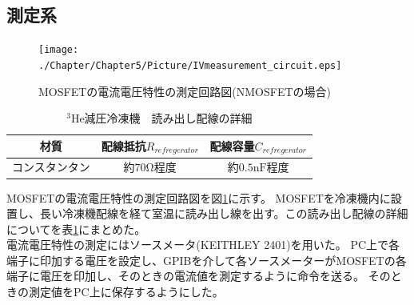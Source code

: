 		\subsection{測定系}
			\begin{figure}[htbp]
				\begin{center}
					\texttt{[image: ./Chapter/Chapter5/Picture/IVmeasurement\_circuit.eps]}
					\caption{MOSFETの電流電圧特性の測定回路図(NMOSFETの場合)}
					\label{fig:IVmeasurement_circuit}
				\end{center}
			\end{figure}
			\begin{table}[htb]
				\begin{center}
					\begin{tabular}{| c | c | c |} \hline
						材質 & 配線抵抗$R_{refregerator}$ & 配線容量$C_{refregerator}$ \\ \hline \hline
						コンスタンタン & 約$70 \mathrm{\Omega}$程度 & 約$0.5 \mathrm{nF}$程度 \\ \hline
					\end{tabular}
					\caption{$\mathrm{^{3}He}$減圧冷凍機　読み出し配線の詳細}
					\label{tab:refregerator_wire}
				\end{center}
			\end{table}
			MOSFETの電流電圧特性の測定回路図を図\ref{fig:IVmeasurement_circuit}に示す。
			MOSFETを冷凍機内に設置し、長い冷凍機配線を経て室温に読み出し線を出す。この読み出し配線の詳細についてを表\ref{tab:refregerator_wire}にまとめた。\\
			電流電圧特性の測定にはソースメータ(KEITHLEY 2401)を用いた。
			PC上で各端子に印加する電圧を設定し、GPIBを介して各ソースメーターがMOSFETの各端子に電圧を印加し、そのときの電流値を測定するように命令を送る。
			そのときの測定値をPC上に保存するようにした。
